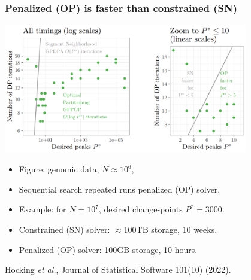\documentclass{beamer}
\begin{document}
\begin{frame}
  \frametitle{Penalized (OP) is faster than constrained (SN)}
  
  \includegraphics[width=0.8\textwidth]{figure-OP-faster-than-SN.png}

  \begin{itemize}
  \item Figure: genomic data, $N\approx 10^6$, 
  \item Sequential search repeated runs penalized (OP) solver.
  \item Example: for $N=10^7$, desired change-points $P^*=3000$.
  \item Constrained (SN) solver: $\approx$100TB storage, 10 weeks.
  \item Penalized (OP) solver: 100GB storage, 10 hours.
  \end{itemize}
  Hocking \emph{et al.}, Journal of Statistical Software 101(10) (2022).
\end{frame}
\end{document}
